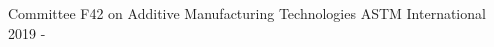 \begin{cventries}

\cventry
{Committee F42 on Additive Manufacturing Technologies}
{ASTM International}
{}
{2019 - }
{}

\end{cventries}
